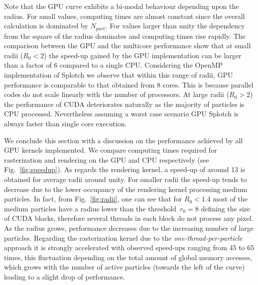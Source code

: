 \documentclass[smallextended]{svjour3}
\begin{document}
Note that the GPU curve exhibits a bi-modal behaviour depending upon the radius. For small values, computing times are almost constant since the overall calculation is dominated by $N_{part}$. For values larger than unity the dependency from the square of the radius dominates and computing times rise rapidly. The comparison between the GPU and the multicore performance show that at small radii ($R_0 < 2$) the speed-up gained by the GPU implementation can be larger than a factor of 6 compared to a single CPU. Considering the OpenMP implementation of Splotch we observe that within this range of radii, GPU performance is comparable to that obtained from 8 cores. This is because parallel codes do not scale linearly with the number of processors. At large radii ($R_0 > 2$) the performance of CUDA deteriorates naturally as the majority of particles is CPU processed. Nevertheless assuming a worst case scenario GPU Splotch is always faster than single core execution. 

We conclude this section with a discussion on the performance achieved by all GPU kernels implemented. 
We compare computing times required for rasterization and rendering on the 
GPU and CPU respectively (see Fig.~\ref{fig:speedup}). 
As regards the rendering kernel, a speed-up of around 13 is obtained for average radii around unity. For smaller radii the speed-up
tends to decrease due to the lower occupancy of the rendering kernel processing medium particles.
In fact, from Fig.~\ref{fig:radii}, one can see that for $R_0<1.4$ most of the medium particles have a radius lower than the threshold~$r_0=8$ defining the size of CUDA blocks, therefore several threads in each block do not process any pixel.
As the radius grows, performance decreases due to the increasing number of large particles.
Regarding the rasterization kernel due to the {\it one-thread-per-particle} approach it is strongly accelerated with observed speed-ups ranging from 45 to 65 times, this fluctuation depending on the total amount of global memory accesses, which grows with the number of active particles (towards the left of the curve) leading to a slight drop of performance. 
\end{document}
